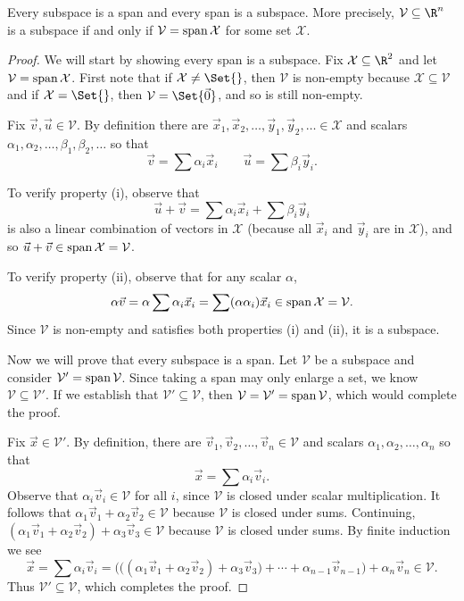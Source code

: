 \begin{theorem}
	Every subspace is a span and every span is a subspace.  More precisely,
	$\mathcal V\subseteq \R^n$ is a subspace if and only if $\mathcal V=
	\operatorname{span}\mathcal X$ for some set $\mathcal X$.
\end{theorem}
\begin{proof}
	We will start by showing every span is a subspace.  Fix $\mathcal X\subseteq\R^2$
	and let
	$\mathcal V=\operatorname{span}\mathcal X$. First note that if $\mathcal X\neq \Set{}$, then $\mathcal V$
	is non-empty because $\mathcal X\subseteq\mathcal V$ and if $\mathcal X=\Set{}$, then $\mathcal V=\Set{\vec 0}$,
	and so is still non-empty.
	
	Fix $\vec v,\vec u\in\mathcal V$. By definition there are $\vec x_1,\vec x_2,\ldots,\vec y_1,\vec y_2,\ldots\in\mathcal X$ 
	and scalars $\alpha_1,\alpha_2,\ldots,\beta_1,\beta_2,\ldots$ so that
	\[
		\vec v=\sum \alpha_i\vec x_i\qquad \vec u=\sum\beta_i\vec y_i.
	\]

	To verify property (i), observe that
	\[
		\vec u+\vec v=\sum\alpha_i\vec x_i + \sum\beta_i\vec y_i
	\]
	is also a linear combination of vectors in $\mathcal X$ (because all $\vec x_i$ and $\vec y_i$
	are in $\mathcal X$), and so $\vec u+\vec v\in	\operatorname{span}\mathcal X=\mathcal V$.
	
	To verify property (ii), observe that for any scalar $\alpha$, 
	\[
		\alpha\vec v=\alpha\sum \alpha_i\vec x_i = \sum (\alpha\alpha_i)\vec x_i\in
		\operatorname{span}\mathcal X=\mathcal V.
	\]
	Since $\mathcal V$ is non-empty and satisfies both properties (i) and (ii), it is a subspace.

	Now we will prove that every subspace is a span. Let $\mathcal V$ be a subspace
	and consider $\mathcal V'=\operatorname{span}\mathcal V$.  Since taking a span may only enlarge a set, we know
	$\mathcal V\subseteq \mathcal V'$. If we establish that $\mathcal V'\subseteq\mathcal V$,
	then $\mathcal V=\mathcal V'=\operatorname{span}\mathcal V$, which would complete the proof.

	Fix $\vec x\in\mathcal V'$. By definition, there are $\vec v_1,\vec v_2,\ldots,\vec v_n\in\mathcal V$ and scalars
	$\alpha_1,\alpha_2,\ldots,\alpha_n$ so that
	\[
		\vec x=\sum \alpha_i\vec v_i.
	\]
	Observe that 
	$\alpha_i\vec v_i\in\mathcal V$ for all $i$, since $\mathcal V$ is closed under scalar
	multiplication. It follows that $\alpha_1\vec v_1+\alpha_2\vec v_2\in\mathcal V$
	because $\mathcal V$ is closed under sums. Continuing, 
	$(\alpha_1\vec v_1+\alpha_2\vec v_2)+\alpha_3\vec v_3\in\mathcal V$ because
	$\mathcal V$ is closed under sums. By finite induction we see
	\[
		\vec x=\sum \alpha_i\vec v_i
		=\Big(\big((\alpha_1\vec v_1+\alpha_2\vec v_2)
		+\alpha_3\vec v_3\big)+\cdots+\alpha_{n-1}\vec v_{n-1} \Big)
		+\alpha_n\vec v_n\in\mathcal V.
	\]
	Thus $\mathcal V'\subseteq\mathcal V$, which completes the proof.
\end{proof}

